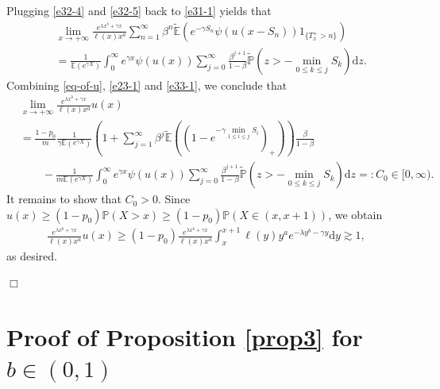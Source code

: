 \documentclass[11pt]{article}
\numberwithin{equation}{section}
\begin{document}
Plugging \eqref{e32-4} and \eqref{e32-5} back to \eqref{e31-1} yields that 
\begin{align}\label{e33-1}
	& \lim_{x\to+\infty} \frac{e^{\lambda x^b+ \gamma x} }{\ell(x)x^a }\sum_{n=1}^\infty \beta^{n}\widetilde{\mathbb{E}}\left(e^{-\gamma S_n} \psi\left(u(x-S_n)\right)1_{\{T_x^+>n\}}\right)\nonumber\\
	& = \frac{1}{\mathbb{E}(e^{\gamma X})} \int_0^\infty e^{\gamma x}\psi(u(x))  \sum_{j=0}^\infty \frac{\beta^{j+1}}{1-\beta} \widetilde{\mathbb{P}}\left(z> -\min_{0\leq k\leq j} S_k \right)\mathrm{d} z.
\end{align}
Combining \eqref{eq-of-u}, \eqref{e23-1} and \eqref{e33-1}, we conclude that 
\begin{align}\label{expression-of-C}
	& \lim_{x\to+\infty} \frac{e^{\lambda x^b+ \gamma x}}{\ell(x)x^a  } u(x)\nonumber\\
	& = \frac{1-p_0}{m}\frac{1}{\gamma \mathbb{E}(e^{\gamma X})} \left(1+ \sum_{j=1}^{\infty}\beta^j \widetilde{\mathbb{E}}\left( \left(1-e^{-\gamma \min_{1\leq i\leq j} S_i}\right)_+\right) \right)\frac{\beta}{1-\beta}\nonumber\\
	&\qquad - \frac{1}{m\mathbb{E}(e^{\gamma X})} \int_0^\infty e^{\gamma x}\psi(u(x))  \sum_{j=0}^\infty \frac{\beta^{j+1}}{1-\beta} \widetilde{\mathbb{P}}\left(z> -\min_{0\leq k\leq j} S_k \right)\mathrm{d} z=: C_0\in [0, \infty). 
\end{align}
It remains to show that $C_0>0$. Since $u(x)\geq (1-p_0)\mathbb{P}(X>x) \geq (1-p_0)\mathbb{P}(X\in (x,x+1))$, we obtain
\begin{align}
	\frac{e^{\lambda x^b+ \gamma x}}{\ell(x)x^a } u(x) \geq (1-p_0) \frac{e^{\lambda x^b+\gamma x}}{\ell(x)x^a  }  \int_x^{x+1}\ell(y)y^ae^{-\lambda y^b-\gamma y}\mathrm{d} y\gtrsim 1,
\end{align}
as desired. 

\hfill$\Box$

\section{Proof of Proposition \ref{prop3} for $b\in (0,1)$}\label{Appendix}
\end{document}
